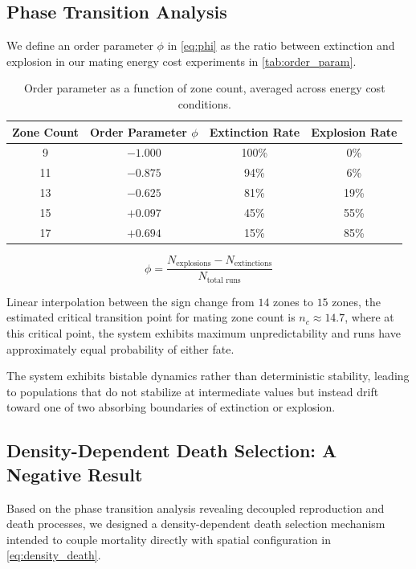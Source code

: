 \documentclass[dvipsnames,format=sigconf,anonymous=false,review=false]{acmart}
\begin{document}
\subsection{Phase Transition Analysis}

We define an order parameter $\phi$ in \autoref{eq:phi} as the ratio between extinction and explosion in our mating energy cost experiments in \autoref{tab:order_param}.
\begin{table}[H]
\centering
\begin{tabular}{@{}cccc@{}}
\toprule
Zone Count & Order Parameter $\phi$ & Extinction Rate & Explosion Rate \\
\midrule
9 & $-1.000$ & 100\% & 0\% \\
11 & $-0.875$ & 94\% & 6\% \\
13 & $-0.625$ & 81\% & 19\% \\
15 & $+0.097$ & 45\% & 55\% \\
17 & $+0.694$ & 15\% & 85\% \\
\bottomrule
\end{tabular}
\caption{Order parameter as a function of zone count, averaged across energy cost conditions.}
\label{tab:order_param}
\end{table}
\begin{equation}
\phi = \frac{N_{\text{explosions}} - N_{\text{extinctions}}}{N_{\text{total runs}}}
\end{equation}
\label{eq:phi}



Linear interpolation between the sign change from $14$ zones to $15$ zones, the estimated critical transition point for mating zone count is $n_c \approx 14.7$, where at this critical point, the system exhibits maximum unpredictability and runs have approximately equal probability of either fate.

The system exhibits bistable dynamics rather than deterministic stability, leading to populations that do not stabilize at intermediate values but instead drift toward one of two absorbing boundaries of extinction or explosion.

\subsection{Density-Dependent Death Selection: A Negative Result}

Based on the phase transition analysis revealing decoupled reproduction and death processes, we designed a density-dependent death selection mechanism intended to couple mortality directly with spatial configuration in \autoref{eq:density_death}.
\end{document}
